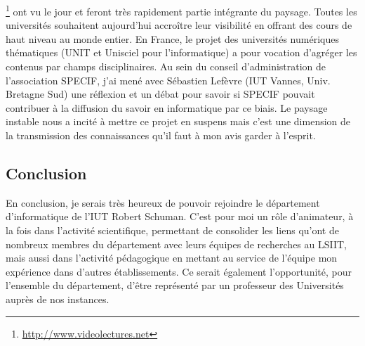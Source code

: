 \documentclass[11pt]{article}
\begin{document}
\footnote{\url{http://www.videolectures.net}} ont vu le jour et feront très rapidement
partie intégrante du paysage. Toutes les universités souhaitent aujourd'hui accroître leur 
visibilité en offrant des cours de haut niveau au monde entier. En France, le projet
des universités numériques thématiques (UNIT et Unisciel pour l'informatique) a pour 
vocation d'agréger les contenus par champs disciplinaires. 
Au sein du conseil d'administration de l'association SPECIF, j'ai mené avec Sébastien 
Lefèvre (IUT Vannes, Univ. Bretagne Sud) une réflexion et un débat pour savoir si SPECIF 
pouvait contribuer à la diffusion du savoir en informatique par ce biais. Le paysage 
instable nous a incité à mettre ce projet en suspens mais c'est une dimension de la 
transmission des connaissances qu'il faut à mon avis garder à l'esprit.\\


\subsection*{Conclusion}

En conclusion, je serais très heureux de pouvoir rejoindre le département d'informatique 
de l'IUT Robert Schuman. C'est pour moi un rôle d'animateur, à la fois dans l'activité
scientifique, permettant de consolider les liens qu'ont de nombreux membres du département
avec leurs équipes de recherches au LSIIT, mais aussi dans l'activité pédagogique en mettant
au service de l'équipe mon expérience dans d'autres établissements. Ce serait également 
l'opportunité, pour l'ensemble du département, d'être représenté par un professeur des
Universités auprès de nos instances.



 


\end{document}
